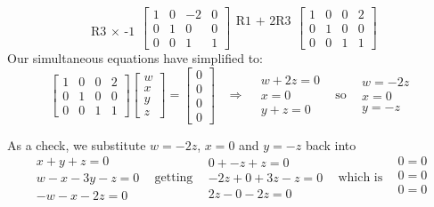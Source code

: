 \documentclass[]{article}
\begin{document}
\[
\begin{matrix}
\\
\\
\text{R3 $\times$ -1} \\
\end{matrix}
\begin{bmatrix}
1  &  0 & -2 & 0 \\
0  &  1 & 0  & 0 \\
0  &  0 & 1  & 1
\end{bmatrix}
\begin{matrix}
\text{R1 + 2R3} \\
\\
\\
\end{matrix}
\begin{bmatrix}
1  &  0 & 0  & 2 \\
0  &  1 & 0  & 0 \\
0  &  0 & 1  & 1
\end{bmatrix}
\]
Our simultaneous equations have simplified to:
\[
\begin{bmatrix}
1  &  0 & 0  & 2 \\
0  &  1 & 0  & 0 \\
0  &  0 & 1  & 1
\end{bmatrix}
\begin{bmatrix}
w \\ x \\ y \\ z
\end{bmatrix}
=
\begin{bmatrix}
0 \\ 0 \\ 0 \\ 0
\end{bmatrix}
\;\;\;
\Rightarrow
\;\;\;
\begin{matrix}
w + 2z = 0 \\
x = 0 \\
y + z = 0
\end{matrix}
\;\;\; \text{so} \;\;\;
\begin{matrix}
w = -2z \\ x = 0 \\ y = -z
\end{matrix}
\]

As a check, we substitute $w = -2z $, $x=0$ and $ y = -z $ back into
\[
\begin{matrix}
x+y+z = 0 \\
w-x-3y-z = 0 \\
-w-x-2z = 0
\end{matrix} \;\;\;
\text{getting} \;\;\;
\begin{matrix}
0 + -z + z =0 \\
-2z + 0 + 3z -z =0\\
2z - 0 - 2z = 0
\end{matrix} \;\;\;
\text{which is} \;\;\;
\begin{matrix}
0 = 0 \\
0 = 0 \\
0 = 0 \\
\end{matrix}
\]
\end{document}
